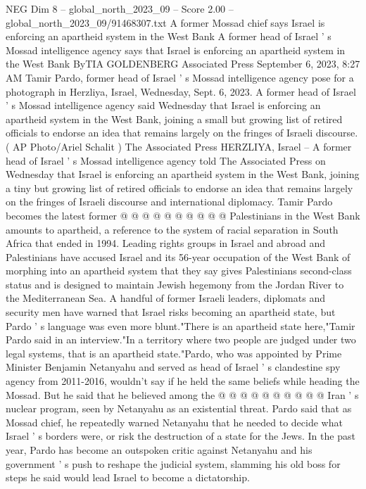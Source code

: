 \begin{textsample}{NEG Dim 8 – global\_north\_2023\_09 – Score 2.00 – global\_north\_2023\_09/91468307.txt}  \label{ex:f8_neg_157}
A former Mossad chief says Israel is enforcing an apartheid system in the West Bank A former head of Israel ' s Mossad intelligence agency says that Israel is enforcing an apartheid system in the West Bank ByTIA GOLDENBERG Associated Press September 6, 2023, 8:27 AM Tamir Pardo, former head of Israel ' s Mossad intelligence agency pose for a photograph in Herzliya, Israel, Wednesday, Sept. 6, 2023.
A former head of Israel ' s Mossad intelligence agency said Wednesday that Israel is enforcing an apartheid system in the West Bank, joining a small but growing list of retired officials to endorse an idea that remains largely on the fringes of Israeli discourse. ( AP Photo/Ariel Schalit ) The Associated Press HERZLIYA, Israel -- A former head of Israel ' s Mossad intelligence agency told The Associated Press on Wednesday that Israel is enforcing an apartheid system in the West Bank, joining a tiny but growing list of retired officials to endorse an idea that remains largely on the fringes of Israeli discourse and international diplomacy.
Tamir Pardo becomes the latest former @ @ @ @ @ @ @ @ @ @ Palestinians in the West Bank amounts to apartheid, a reference to the system of racial separation in South Africa that ended in 1994.
Leading rights groups in Israel and abroad and Palestinians have accused Israel and its 56-year occupation of the West Bank of morphing into an apartheid system that they say gives Palestinians second-class status and is designed to maintain Jewish hegemony from the Jordan River to the Mediterranean Sea.
A handful of former Israeli leaders, diplomats and security men have warned that Israel risks becoming an apartheid state, but Pardo ' s language was even more blunt."There is an apartheid state here,"Tamir Pardo said in an interview."In a territory where two people are judged under two legal systems, that is an apartheid state."Pardo, who was appointed by Prime Minister Benjamin Netanyahu and served as head of Israel ' s clandestine spy agency from 2011-2016, wouldn't say if he held the same beliefs while heading the Mossad.
But he said that he believed among the @ @ @ @ @ @ @ @ @ @ Iran ' s nuclear program, seen by Netanyahu as an existential threat.
Pardo said that as Mossad chief, he repeatedly warned Netanyahu that he needed to decide what Israel ' s borders were, or risk the destruction of a state for the Jews.
In the past year, Pardo has become an outspoken critic against Netanyahu and his government ' s push to reshape the judicial system, slamming his old boss for steps he said would lead Israel to become a dictatorship.

\end{textsample}
